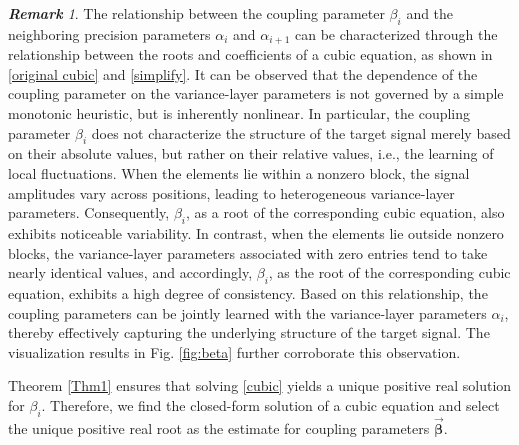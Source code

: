 \documentclass[lettersize,journal]{IEEEtran}
\theoremstyle{remark}
\newtheorem{remark}{\textbf{Remark}}
\begin{document}
\begin{remark}
	The relationship between the coupling parameter $\beta_i$ and the neighboring precision parameters $\alpha_i$ and $\alpha_{i+1}$ can be characterized through the relationship between the roots and coefficients of a cubic equation, as shown in \eqref{original cubic} and \eqref{simplify}. It can be observed that the dependence of the coupling parameter on the variance-layer parameters is not governed by a simple monotonic heuristic, but is inherently nonlinear. In particular, the coupling parameter $\beta_i$ does not characterize the structure of the target signal merely based on their absolute values, but rather on their relative values, i.e., the learning of local fluctuations. When the elements lie within a nonzero block, the signal amplitudes vary across positions, leading to heterogeneous variance-layer parameters. Consequently, $\beta_i$, as a root of the corresponding cubic equation, also exhibits noticeable variability. In contrast, when the elements lie outside nonzero blocks, the variance-layer parameters associated with zero entries tend to take nearly identical values, and accordingly, $\beta_i$, as the root of the corresponding cubic equation, exhibits a high degree of consistency. Based on this relationship, the coupling parameters can be jointly learned with the variance-layer parameters $\alpha_i$, thereby effectively capturing the underlying structure of the target signal. The visualization results in Fig. \ref{fig:beta} further corroborate this observation.
\end{remark}

Theorem \ref{Thm1} ensures that solving \eqref{cubic} yields a unique positive real solution for \(\beta_i\). Therefore, we find the closed-form solution of a cubic equation and select the unique positive real root as the estimate for coupling parameters \(\vec{\boldsymbol{\beta}}\).
\end{document}
